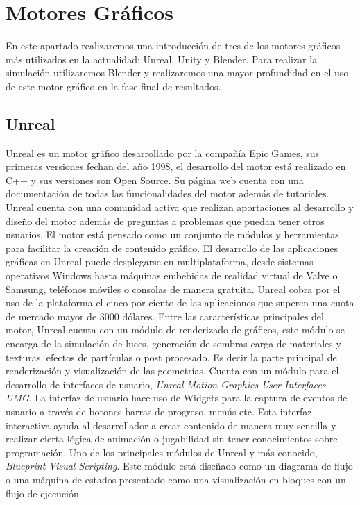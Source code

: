 \documentclass[a4paper]{book}
\begin{document}
\section{Motores Gráficos}
\label{sec:Motores}

En este apartado realizaremos una introducción de tres de los motores gráficos más utilizados
en la actualidad; Unreal, Unity y Blender. Para realizar la simulación utilizaremos Blender y
realizaremos una mayor profundidad en el uso de este motor gráfico en la fase final de resultados.

\subsection{Unreal}
\label{subsec:Unreal}

Unreal es un motor gráfico desarrollado por la compañía Epic Games, sus primeras versiones fechan del año
1998, el desarrollo del motor está realizado en C++ y sus versiones son Open Source. Su página web cuenta
con una documentación de todas las funcionalidades del motor además de tutoriales. Unreal cuenta con una
comunidad activa que realizan aportaciones al desarrollo y diseño del motor además de preguntas a problemas
que puedan tener otros usuarios. El motor está pensado como un conjunto de módulos y herramientas para
facilitar la creación de contenido gráfico. El desarrollo de las aplicaciones gráficas en Unreal puede desplegarse en
multiplataforma, desde sistemas operativos Windows hasta máquinas embebidas de realidad virtual de Valve o Samsung,
teléfonos móviles o consolas de manera gratuita. Unreal cobra por el uso de la plataforma el cinco por ciento de las aplicaciones que
superen una cuota de mercado mayor de 3000 dólares. Entre las características principales del motor, Unreal cuenta con un
módulo de renderizado de gráficos, este módulo se encarga de la simulación de luces, generación de sombras carga de materiales
y texturas, efectos de partículas o post procesado. Es decir la parte principal de renderización y visualización de las geometrías. Cuenta
con un módulo para el desarrollo de interfaces de usuario, \textit{Unreal Motion Graphics User Interfaces UMG}. La 
interfaz de usuario hace uso de Widgets para la captura de eventos de usuario a través de botones barras
de progreso, menús etc. Esta interfaz interactiva ayuda al desarrollador a crear contenido de manera muy
sencilla y realizar cierta lógica de animación o jugabilidad sin tener conocimientos sobre programación. Uno de los principales módulos
de Unreal y más conocido, \textit{Blueprint Visual Scripting}. Este módulo está diseñado como un diagrama de flujo o una máquina de
estados presentado como una visualización en bloques con un flujo de ejecución.
\end{document}

